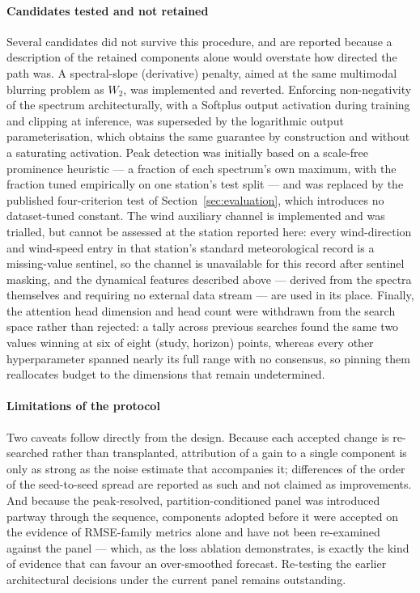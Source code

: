 \paragraph{Candidates tested and not retained}
Several candidates did not survive this procedure, and are reported because a description of the retained components alone would overstate how directed the path was. A spectral-slope (derivative) penalty, aimed at the same multimodal blurring problem as $W_2$, was implemented and reverted. Enforcing non-negativity of the spectrum architecturally, with a Softplus output activation during training and clipping at inference, was superseded by the logarithmic output parameterisation, which obtains the same guarantee by construction and without a saturating activation. Peak detection was initially based on a scale-free prominence heuristic — a fraction of each spectrum's own maximum, with the fraction tuned empirically on one station's test split — and was replaced by the published four-criterion test of Section~\ref{sec:evaluation}, which introduces no dataset-tuned constant. The wind auxiliary channel is implemented and was trialled, but cannot be assessed at the station reported here: every wind-direction and wind-speed entry in that station's standard meteorological record is a missing-value sentinel, so the channel is unavailable for this record after sentinel masking, and the dynamical features described above — derived from the spectra themselves and requiring no external data stream — are used in its place. Finally, the attention head dimension and head count were withdrawn from the search space rather than rejected: a tally across previous searches found the same two values winning at six of eight (study, horizon) points, whereas every other hyperparameter spanned nearly its full range with no consensus, so pinning them reallocates budget to the dimensions that remain undetermined.

\paragraph{Limitations of the protocol}
Two caveats follow directly from the design. Because each accepted change is re-searched rather than transplanted, attribution of a gain to a single component is only as strong as the noise estimate that accompanies it; differences of the order of the seed-to-seed spread are reported as such and not claimed as improvements. And because the peak-resolved, partition-conditioned panel was introduced partway through the sequence, components adopted before it were accepted on the evidence of RMSE-family metrics alone and have not been re-examined against the panel — which, as the loss ablation demonstrates, is exactly the kind of evidence that can favour an over-smoothed forecast. Re-testing the earlier architectural decisions under the current panel remains outstanding.
